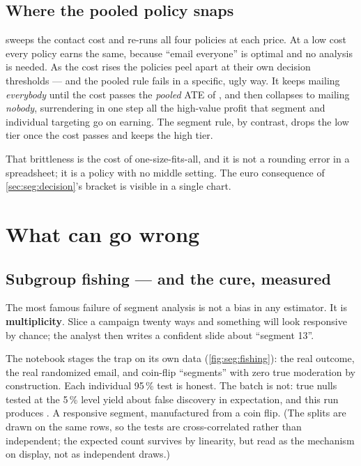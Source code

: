 \subsection*{Where the pooled policy snaps}

 sweeps the contact cost and re-runs all four policies at each price. At a
low cost every policy earns the same, because ``email everyone'' is optimal and no analysis is
needed. As the cost rises the policies peel apart at their own decision thresholds --- and the
pooled rule fails in a specific, ugly way. It keeps mailing \emph{everybody} until the cost passes
the \emph{pooled} ATE of \eur{\nbTwoAte}, and then collapses to mailing \emph{nobody}, surrendering
in one step all the high-value profit that segment and individual targeting go on earning. The
segment rule, by contrast, drops the low tier once the cost passes \eur{\nbTwoCateLow} and keeps the
high tier.



That brittleness is the cost of one-size-fits-all, and it is not a rounding error in a spreadsheet;
it is a policy with no middle setting. The euro consequence of \cref{sec:seg:decision}'s bracket is
visible in a single chart.

\section{What can go wrong}
\label{sec:seg:wrong}

\subsection*{Subgroup fishing --- and the cure, measured}

The most famous failure of segment analysis is not a bias in any estimator. It is
\textbf{multiplicity}. Slice a campaign twenty ways and something will look responsive by chance;
the analyst then writes a confident slide about ``segment 13''.

The notebook stages the trap on its own data (\cref{fig:seg:fishing}): the real outcome, the real
randomized email, and \nbTwoNFish{} coin-flip ``segments'' with zero true moderation by construction.
Each individual 95\,\% test is honest. The batch is not: \nbTwoNFish{} true nulls tested at the
5\,\% level yield about \nbTwoFishExpected{} false discovery in expectation, and this run produces
\nbTwoFishHits. A responsive segment, manufactured from a coin flip. (The \nbTwoNFish{} splits are
drawn on the same \nbTwoN{} rows, so the tests are cross-correlated rather than independent; the
expected count survives by linearity, but read \nbTwoFishHits{} as the mechanism on display, not as
\nbTwoNFish{} independent draws.)

